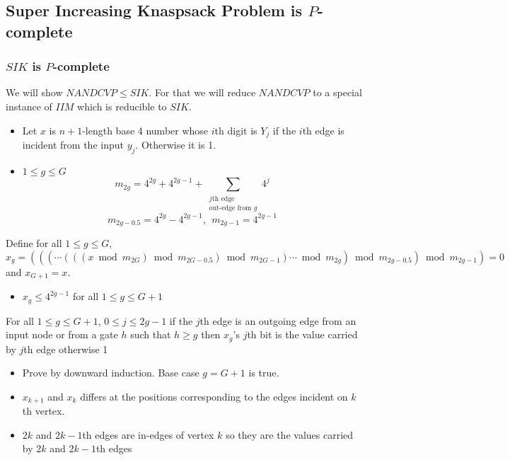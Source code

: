 \documentclass[article,10pt]{beamer}%
\begin{document}
\subsection{Super Increasing Knaspsack Problem is $P$-complete}
\begin{frame}[allowframebreaks]
\frametitle{$SIK$ is $P$-complete}
We will show $NANDCVP\leq SIK$. For that we will reduce $NANDCVP$ to a special instance of $IIM$ which is reducible to $SIK$.\begin{itemize}
	\item Let $x$ is $n+1$-length base 4 number whose $i$th digit is $Y_j$ if the $i$th edge is incident from the input $y_j$. Otherwise it is 1.
	\item $1\leq g\leq G$  $$m_{2g}=4^{2g}+4^{2g-1}+\sum_{\substack{j\text{th edge}\\ \text{out-edge from }g}}4^j$$ $$m_{2g-0.5}=4^{2g}-4^{2g-1},\ \ m_{2g-1}=4^{2g-1}$$
\end{itemize}
\framebreak
Define for all $1\leq g\leq  G$,\\
 $x_g=(((\cdots (((x\bmod{m_{2G}})\bmod{m_{2G-0.5}})\bmod{m_{2G-1}})\cdots\bmod{m_{2g}})\bmod{m_{2g-0.5}})\bmod{m_{2g-1}})=0$ and $x_{G+1}=x$.\vspace{5mm}
\begin{itemize}
	\item $x_g\leq 4^{2g-1}$ for all $1\leq g \leq G+1$
\end{itemize}
\framebreak


	\begin{theorem}
		For all $1\leq g\leq G+1$, $0\leq j\leq 2g-1$ if the $j$th edge is an outgoing edge from an input node or from a gate $h$ such that $h\geq g$ then $x_g$'s $j$th bit is the value carried by $j$th edge 		otherwise 1
	\end{theorem}
	\framebreak
	
\begin{itemize}	
	\item Prove by downward induction. Base case $g=G+1$ is true.
	\item $x_{k+1}$ and $x_k$ differs at the positions corresponding to the edges incident on $k$th vertex.
	\item $2k$ and $2k-1$th edges are in-edges of vertex $k$ so they are the values carried by $2k$ and $2k-1$th edges
	

\end{itemize}
\end{frame}
\end{document}
